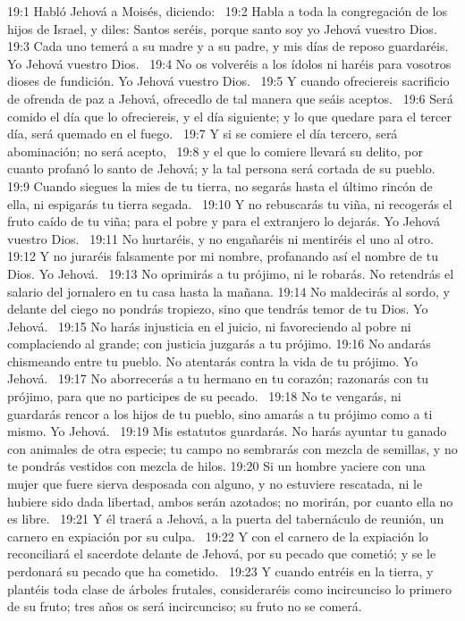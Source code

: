 19:1 Habló Jehová a Moisés, diciendo:  
19:2 Habla a toda la congregación de los hijos de Israel, y diles: Santos seréis, porque santo soy yo Jehová vuestro Dios.  
19:3 Cada uno temerá a su madre y a su padre, y mis días de reposo guardaréis. Yo Jehová vuestro Dios.  
19:4 No os volveréis a los ídolos ni haréis para vosotros dioses de fundición. Yo Jehová vuestro Dios.  
19:5 Y cuando ofreciereis sacrificio de ofrenda de paz a Jehová, ofrecedlo de tal manera que seáis aceptos.  
19:6 Será comido el día que lo ofreciereis, y el día siguiente; y lo que quedare para el tercer día, será quemado en el fuego.  
19:7 Y si se comiere el día tercero, será abominación; no será acepto,  
19:8 y el que lo comiere llevará su delito, por cuanto profanó lo santo de Jehová; y la tal persona será cortada de su pueblo.  
19:9 Cuando siegues la mies de tu tierra, no segarás hasta el último rincón de ella, ni espigarás tu tierra segada.  
19:10 Y no rebuscarás tu viña, ni recogerás el fruto caído de tu viña; para el pobre y para el extranjero lo dejarás. Yo Jehová vuestro Dios.  
19:11 No hurtaréis, y no engañaréis ni mentiréis el uno al otro.  
19:12 Y no juraréis falsamente por mi nombre, profanando así el nombre de tu Dios. Yo Jehová.  
19:13 No oprimirás a tu prójimo, ni le robarás. No retendrás el salario del jornalero en tu casa hasta la mañana. 
19:14 No maldecirás al sordo, y delante del ciego no pondrás tropiezo, sino que tendrás temor de tu Dios. Yo Jehová.  
19:15 No harás injusticia en el juicio, ni favoreciendo al pobre ni complaciendo al grande; con justicia juzgarás a tu prójimo. 
19:16 No andarás chismeando entre tu pueblo. No atentarás contra la vida de tu prójimo. Yo Jehová.  
19:17 No aborrecerás a tu hermano en tu corazón; razonarás con tu prójimo, para que no participes de su pecado.  
19:18 No te vengarás, ni guardarás rencor a los hijos de tu pueblo, sino amarás a tu prójimo como a ti mismo. Yo Jehová.  
19:19 Mis estatutos guardarás. No harás ayuntar tu ganado con animales de otra especie; tu campo no sembrarás con mezcla de semillas, y no te pondrás vestidos con mezcla de hilos. 
19:20 Si un hombre yaciere con una mujer que fuere sierva desposada con alguno, y no estuviere rescatada, ni le hubiere sido dada libertad, ambos serán azotados; no morirán, por cuanto ella no es libre.  
19:21 Y él traerá a Jehová, a la puerta del tabernáculo de reunión, un carnero en expiación por su culpa.  
19:22 Y con el carnero de la expiación lo reconciliará el sacerdote delante de Jehová, por su pecado que cometió; y se le perdonará su pecado que ha cometido.  
19:23 Y cuando entréis en la tierra, y plantéis toda clase de árboles frutales, consideraréis como incircunciso lo primero de su fruto; tres años os será incircunciso; su fruto no se comerá.  
